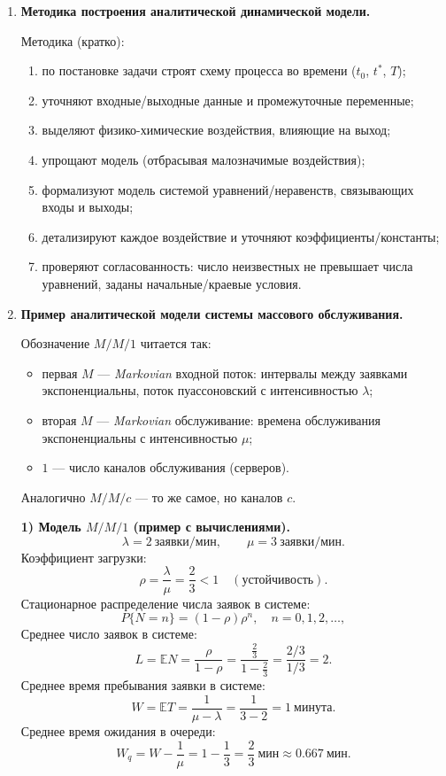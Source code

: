 \documentclass[12pt,a4paper]{article}
\begin{document}
\begin{enumerate}[label=\textbf{\arabic*.}]
\item \textbf{Методика построения аналитической динамической модели.}

Методика (кратко):
\begin{enumerate}[label=\arabic*)]
\item по постановке задачи строят схему процесса во времени ($t_0$, $t^{*}$, $T$);
\item уточняют входные/выходные данные и промежуточные переменные;
\item выделяют физико-химические воздействия, влияющие на выход;
\item упрощают модель (отбрасывая малозначимые воздействия);
\item формализуют модель системой уравнений/неравенств, связывающих входы и выходы;
\item детализируют каждое воздействие и уточняют коэффициенты/константы;
\item проверяют согласованность: число неизвестных не превышает числа уравнений, заданы начальные/краевые условия.
\end{enumerate}
\item \textbf{Пример аналитической модели системы массового обслуживания.}

Обозначение \textbf{$M/M/1$} читается так:
\begin{itemize}
\item первая $M$ — \emph{Markovian} входной поток: интервалы между заявками экспоненциальны, поток пуассоновский с интенсивностью $\lambda$;
\item вторая $M$ — \emph{Markovian} обслуживание: времена обслуживания экспоненциальны с интенсивностью $\mu$;
\item $1$ — число каналов обслуживания (серверов).
\end{itemize}
Аналогично \textbf{$M/M/c$} — то же самое, но каналов $c$.

\textbf{1) Модель $M/M/1$ (пример с вычислениями).}
\[
\lambda=2\ \text{заявки/мин},\qquad \mu=3\ \text{заявки/мин}.
\]
Коэффициент загрузки:
\[
\rho=\frac{\lambda}{\mu}=\frac{2}{3}<1 \quad (\text{устойчивость}).
\]
Стационарное распределение числа заявок в системе:
\[
P\{N=n\}=(1-\rho)\rho^n,\quad n=0,1,2,\dots,
\]
Среднее число заявок в системе:
\[
L=\mathbb{E}N=\frac{\rho}{1-\rho}=\frac{\tfrac23}{1-\tfrac23}=\frac{2/3}{1/3}=2.
\]
Среднее время пребывания заявки в системе:
\[
W=\mathbb{E}T=\frac{1}{\mu-\lambda}=\frac{1}{3-2}=1\ \text{минута}.
\]
Среднее время ожидания в очереди:
\[
W_q=W-\frac{1}{\mu}=1-\frac{1}{3}=\frac{2}{3}\ \text{мин} \approx 0.667\ \text{мин}.
\]


\end{enumerate}
\end{document}
